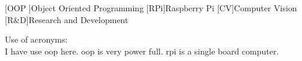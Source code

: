 \begin{acronym}
	[OOP ]{Object Oriented Programming }
	[RPi]{Raspberry Pi}
	[CV]{Computer Vision}
	[R\&D]{Research and Development}
\end{acronym}

Use of acronyms:\\

I have use \ac{oop} here. \ac{oop} is very power full. \Ac{rpi} is a single board computer. 
